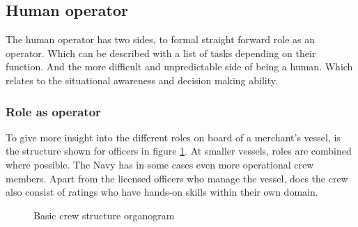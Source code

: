 \subsection{Human operator}
The human operator has two sides, to formal straight forward role as an operator. Which can be described with a list of tasks depending on their function. And the more difficult and unpredictable side of being a human. Which relates to the situational awareness and decision making ability.

\subsubsection{Role as operator}
\label{sec:deck-crew}
To give more insight into the different roles on board of a merchant's vessel, is the structure shown for officers in figure \ref{fig:crew-structure}. At smaller vessels, roles are combined where possible. The Navy has in some cases even more operational crew members. Apart from the licensed officers who manage the vessel, does the crew also consist of ratings who have hands-on skills within their own domain. \cite{Nedcon2013}


\begin{figure}[h]
	\centering
	\caption{Basic crew structure organogram}
	\label{fig:crew-structure}
\end{figure}

